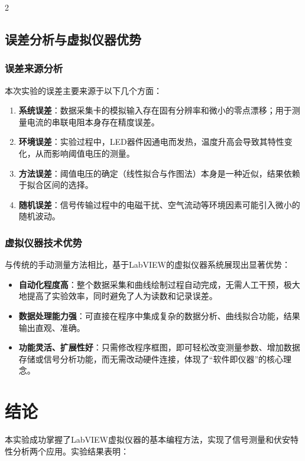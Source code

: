 \documentclass[12pt,a4paper]{article}
\begin{document}
\begin{multicols}{2}
    \subsection{\heiti 误差分析与虚拟仪器优势}
    \songti

    \subsubsection{误差来源分析}
    本次实验的误差主要来源于以下几个方面：
    \begin{enumerate}
        \item \textbf{系统误差}：数据采集卡的模拟输入存在固有分辨率和微小的零点漂移；用于测量电流的串联电阻本身存在精度误差。
        \item \textbf{环境误差}：实验过程中，LED器件因通电而发热，温度升高会导致其特性变化，从而影响阈值电压的测量。
        \item \textbf{方法误差}：阈值电压的确定（线性拟合与作图法）本身是一种近似，结果依赖于拟合区间的选择。
        \item \textbf{随机误差}：信号传输过程中的电磁干扰、空气流动等环境因素可能引入微小的随机波动。
    \end{enumerate}

    \subsubsection{虚拟仪器技术优势}
    与传统的手动测量方法相比，基于LabVIEW的虚拟仪器系统展现出显著优势：
    \begin{itemize}
        \item \textbf{自动化程度高}：整个数据采集和曲线绘制过程自动完成，无需人工干预，极大地提高了实验效率，同时避免了人为读数和记录误差。
        \item \textbf{数据处理能力强}：可直接在程序中集成复杂的数据分析、曲线拟合功能，结果输出直观、准确。
        \item \textbf{功能灵活、扩展性好}：只需修改程序框图，即可轻松改变测量参数、增加数据存储或信号分析功能，而无需改动硬件连接，体现了“软件即仪器”的核心理念。
    \end{itemize}


    \section{\heiti 结\quad 论}
    \songti
    本实验成功掌握了LabVIEW虚拟仪器的基本编程方法，实现了信号测量和伏安特性分析两个应用。实验结果表明：


\end{multicols}
\end{document}
